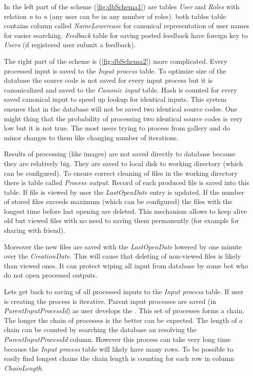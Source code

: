 In the left part of the scheme (\autoref{fig:dbSchema1}) are tables \emph{User} and \emph{Roles} with relation \emph{n} to \emph{n} (any user can be in any number of roles).
both tables table contains column called \emph{NameLowercase} for canonical representation of user names for easier searching.
\emph{Feedback} table for saving posted feedback have foreign key to \emph{Users} (if registered user submit a feedback).

The right part of the scheme is (\autoref{fig:dbSchema2}) more complicated.
Every processed input is saved to the \emph{Input process} table.
To optimize size of the database the source code is not saved for every input process but it is canonicalized and saved to the \emph{Canonic input} table.
Hash is counted for every saved canonical input to speed up lookup for identical inputs.
This system ensures that in the database will not be saved two identical source codes.
One might thing that the probability of processing two identical source codes is very low but it is not true.
The most users trying to process \lsystems from gallery and do minor changes to them like changing number of iterations.

Results of processing (like images) are not saved directly to database because they are relatively big.
They are saved to local disk to working directory (which can be configured).
To ensure correct cleaning of files in the working directory there is table called \emph{Process output}.
Record of each produced file is saved into this table.
If file is viewed by user the \emph{LastOpenDate} entry is updated.
If the number of stored files exceeds maximum (which can be configured) the files with the longest time before last opening are deleted.
This mechanism allows to keep alive old but viewed files with no need to saving them permanently (for example for sharing with friend).

Moreover the new files are saved with the \emph{LastOpenDate} lowered by one minute over the \emph{CreationDate}.
This will cause that deleting of non-viewed files is likely than viewed ones.
It can protect wiping all input from database by some bot who do not open processed outputs.

Lets get back to saving of all processed inputs to the \emph{Input process} table.
If user is creating \lsystem the process is iterative.
Parent input processes are saved (in \emph{ParentInputProcessId}) as user develops the \lsystem.
This set of processes forms a chain.
The longer the chain of processes is the better can be expected.
The length of a chain can be counted by searching the database an resolving the \emph{ParentInputProcessId} column.
However this process can take very long time because the \emph{Input process} table will likely have many rows.
To be possible to easily find longest chains the chain length is counting for each row in column \emph{ChainLength}.

